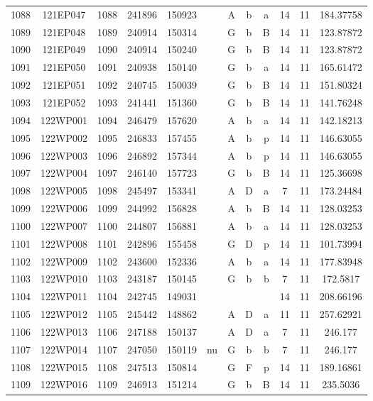 \begin{tabular}{|*{12}{c|}}
1088 & 121EP047 & 1088 & 241896 & 150923 &  & A & b & a & 14 & 11 & 184.37758 \\ 
1089 & 121EP048 & 1089 & 240914 & 150314 &  & G & b & B & 14 & 11 & 123.87872 \\ 
1090 & 121EP049 & 1090 & 240914 & 150240 &  & G & b & B & 14 & 11 & 123.87872 \\ 
1091 & 121EP050 & 1091 & 240938 & 150140 &  & G & b & a & 14 & 11 & 165.61472 \\ 
1092 & 121EP051 & 1092 & 240745 & 150039 &  & G & b & B & 14 & 11 & 151.80324 \\ 
1093 & 121EP052 & 1093 & 241441 & 151360 &  & G & b & B & 14 & 11 & 141.76248 \\ 
1094 & 122WP001 & 1094 & 246479 & 157620 &  & A & b & a & 14 & 11 & 142.18213 \\ 
1095 & 122WP002 & 1095 & 246833 & 157455 &  & A & b & p & 14 & 11 & 146.63055 \\ 
1096 & 122WP003 & 1096 & 246892 & 157344 &  & A & b & p & 14 & 11 & 146.63055 \\ 
1097 & 122WP004 & 1097 & 246140 & 157723 &  & G & b & B & 14 & 11 & 125.36698 \\ 
1098 & 122WP005 & 1098 & 245497 & 153341 &  & A & D & a & 7 & 11 & 173.24484 \\ 
1099 & 122WP006 & 1099 & 244992 & 156828 &  & A & b & B & 14 & 11 & 128.03253 \\ 
1100 & 122WP007 & 1100 & 244807 & 156881 &  & A & b & a & 14 & 11 & 128.03253 \\ 
1101 & 122WP008 & 1101 & 242896 & 155458 &  & G & D & p & 14 & 11 & 101.73994 \\ 
1102 & 122WP009 & 1102 & 243600 & 152336 &  & A & b & a & 14 & 11 & 177.83948 \\ 
1103 & 122WP010 & 1103 & 243187 & 150145 &  & G & b & b & 7 & 11 & 172.5817 \\ 
1104 & 122WP011 & 1104 & 242745 & 149031 &  &  &  &  & 14 & 11 & 208.66196 \\ 
1105 & 122WP012 & 1105 & 245442 & 148862 &  & A & D & a & 11 & 11 & 257.62921 \\ 
1106 & 122WP013 & 1106 & 247188 & 150137 &  & A & D & a & 7 & 11 & 246.177 \\ 
1107 & 122WP014 & 1107 & 247050 & 150119 & nu & G & b & b & 7 & 11 & 246.177 \\ 
1108 & 122WP015 & 1108 & 247513 & 150814 &  & G & F & p & 14 & 11 & 189.16861 \\ 
1109 & 122WP016 & 1109 & 246913 & 151214 &  & G & b & B & 14 & 11 & 235.5036 \\ 

\end{tabular}
